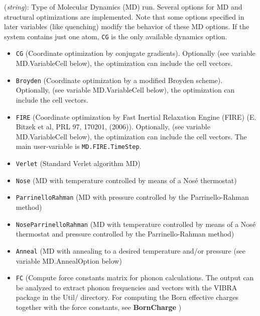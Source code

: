 \documentclass[11pt]{article}
\begin{document}
\begin{description}
\itemsep 10pt
\parsep 0pt

\item[{\bf MD.TypeOfRun}] ({\it string}): 
Type of Molecular Dynamics (MD)  run. 
Several options for MD and structural optimizations are 
implemented. Note that some options specified in later variables
(like quenching) modify the behavior of these MD options.
If the system contains just one atom, {\tt CG} is the only 
available dynamics option.
\begin{itemize}

\item {\tt CG} (Coordinate optimization by conjugate
  gradients). Optionally (see variable MD.VariableCell below), the
  optimization can include the cell vectors.

\item {\tt Broyden} (Coordinate optimization by a modified Broyden
  scheme). Optionally, (see variable MD.VariableCell below), the
  optimization can include the cell vectors.

\item {\tt FIRE} (Coordinate optimization by Fast Inertial Relaxation
  Engine (FIRE) (E. Bitzek et al, PRL 97, 170201, (2006)).
  Optionally, (see variable MD.VariableCell below), the
  optimization can include the cell vectors. The main user-variable
  is {\tt MD.FIRE.TimeStep}.

\item {\tt Verlet} (Standard Verlet algorithm MD)

\item {\tt Nose}  (MD with temperature controlled  by means of a Nos\'e 
thermostat)

\item {\tt ParrinelloRahman}  (MD with pressure controlled by 
the Parrinello-Rahman method)

\item {\tt NoseParrinelloRahman}  (MD with temperature controlled
by means of a Nos\'e thermostat and pressure controlled by 
the Parrinello-Rahman method)

\item {\tt Anneal}  (MD with annealing to a desired
temperature and/or pressure (see variable MD.AnnealOption below)

\item {\tt FC}  (Compute force constants matrix for phonon
calculations. The output can be analyzed to extract phonon
frequencies and vectors with the VIBRA package in the Util/
directory. For computing the Born effective charges together with the
force constants, see {\bf BornCharge}
)


\end{itemize}
\end{description}
\end{document}
